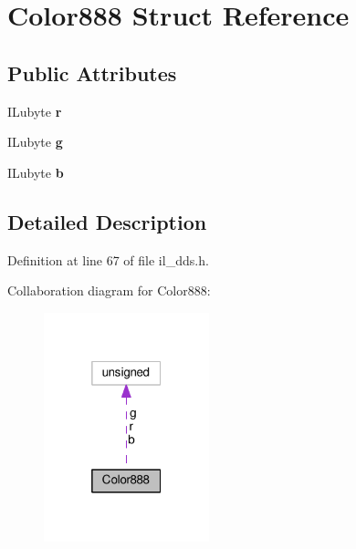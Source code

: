 \hypertarget{structColor888}{}\section{Color888 Struct Reference}
\label{structColor888}
\subsection*{Public Attributes}
\begin{DoxyCompactItemize}
\item 
\mbox{\label{structColor888_a813c8eaa1768c7614e87a9d1f6b382d7}} 
I\+Lubyte {\bfseries r}
\item 
\mbox{\label{structColor888_a7618487b7034f4021bc309190a0b73b8}} 
I\+Lubyte {\bfseries g}
\item 
\mbox{\label{structColor888_a84ecdb42fbfe4a92e5af12c3b7297cf8}} 
I\+Lubyte {\bfseries b}
\end{DoxyCompactItemize}


\subsection{Detailed Description}


Definition at line 67 of file il\+\_\+dds.\+h.



Collaboration diagram for Color888\+:
\nopagebreak
\begin{figure}[H]
\begin{center}
\leavevmode
\includegraphics[width=136pt]{d5/d88/structColor888__coll__graph}
\end{center}
\end{figure}


